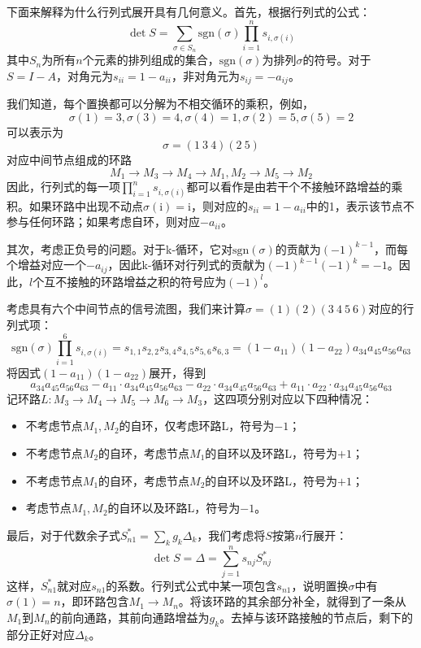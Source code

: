 \documentclass{ctexbook}
\begin{document}
下面来解释为什么行列式展开具有几何意义。首先，根据行列式的公式：
\[\det S=\sum_{\sigma\in S_n}\text{sgn}(\sigma)\prod_{i=1}^{n}s_{i,\sigma(i)}\]
其中$S_n$为所有$n$个元素的排列组成的集合，$\text{sgn}(\sigma)$为排列$\sigma$的符号。对于$S=I-A$，对角元为$s_{ii}=1-a_{ii}$，非对角元为$s_{ij}=-a_{ij}$。

我们知道，每个置换都可以分解为不相交循环的乘积，例如，$$\sigma(1)=3,\sigma(3)=4,\sigma(4)=1,\sigma(2)=5,\sigma(5)=2$$
可以表示为
$$\sigma=(1\ 3\ 4)(2\ 5)$$
对应中间节点组成的环路
$$M_1\to M_3\to M_4\to M_1,M_2\to M_5\to M_2$$
因此，行列式的每一项$\prod_{i=1}^{n}s_{i,\sigma(i)}$都可以看作是由若干个不接触环路增益的乘积。如果环路中出现不动点$\sigma(\mathrm{i})=\mathrm{i}$，则对应的$s_{ii}=1-a_{ii}$中的1，表示该节点不参与任何环路；如果考虑自环，则对应$-a_{ii}$。

其次，考虑正负号的问题。对于k-循环，它对$\text{sgn}(\sigma)$的贡献为$(-1)^{k-1}$，而每个增益对应一个$-a_{ij}$，因此k-循环对行列式的贡献为$(-1)^{k-1}(-1)^k=-1$。因此，$l$个互不接触的环路增益之积的符号应为$(-1)^l$。
\begin{example}
    考虑具有六个中间节点的信号流图，我们来计算$\sigma=(1)(2)(3\ 4\ 5\ 6)$对应的行列式项：
    \[\text{sgn}(\sigma)\prod_{i=1}^{6}s_{i,\sigma(i)}=s_{1,1}s_{2,2}s_{3,4}s_{4,5}s_{5,6}s_{6,3}=(1-a_{11})(1-a_{22})a_{34}a_{45}a_{56}a_{63}\]
    将因式$(1-a_{11})(1-a_{22})$展开，得到
    \[a_{34}a_{45}a_{56}a_{63}-a_{11}\cdot a_{34}a_{45}a_{56}a_{63}-a_{22}\cdot a_{34}a_{45}a_{56}a_{63}+a_{11}\cdot a_{22}\cdot a_{34}a_{45}a_{56}a_{63}\]
    记环路$L:M_3\to M_4\to M_5\to M_6\to M_3$，这四项分别对应以下四种情况：\begin{itemize}
        \item 不考虑节点$M_1,M_2$的自环，仅考虑环路L，符号为$-1$；
        \item 不考虑节点$M_2$的自环，考虑节点$M_1$的自环以及环路L，符号为$+1$；
        \item 不考虑节点$M_1$的自环，考虑节点$M_2$的自环以及环路L，符号为$+1$；
        \item 考虑节点$M_1,M_2$的自环以及环路L，符号为$-1$。
    \end{itemize}
\end{example}

最后，对于代数余子式$S^*_{n1}=\sum_{k}g_k\Delta_k$，我们考虑将$S$按第$n$行展开：
\[\det S=\Delta=\sum_{j=1}^{n}s_{nj}S^*_{nj}\]
这样，$S^*_{n1}$就对应$s_{n1}$的系数。行列式公式中某一项包含$s_{n1}$，说明置换$\sigma$中有$\sigma(1)=n$，即环路包含$M_1\to M_n$。将该环路的其余部分补全，就得到了一条从$M_1$到$M_n$的前向通路，其前向通路增益为$g_k$。去掉与该环路接触的节点后，剩下的部分正好对应$\Delta_k$。
\end{document}
